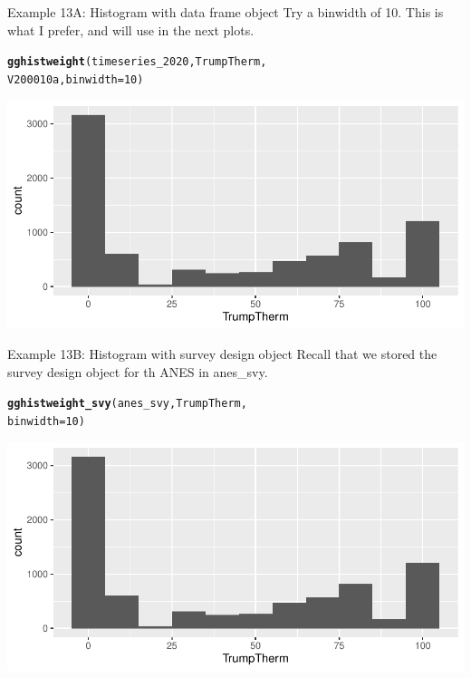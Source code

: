 \documentclass{beamer}\usepackage[]{graphicx}\usepackage[]{xcolor}
\makeatletter
\newcommand{\hlnum}[1]{\textcolor[rgb]{0.686,0.059,0.569}{#1}}%
\newcommand{\hlstd}[1]{\textcolor[rgb]{0.345,0.345,0.345}{#1}}%
\newcommand{\hlkwc}[1]{\textcolor[rgb]{0.333,0.667,0.333}{#1}}%
\newcommand{\hlkwd}[1]{\textcolor[rgb]{0.737,0.353,0.396}{\textbf{#1}}}%
\newenvironment{kframe}{%
 \def\at@end@of@kframe{}%
 \ifinner\ifhmode%
  \def\at@end@of@kframe{\end{minipage}}%
  \begin{minipage}{\columnwidth}%
 \fi\fi%
 \def\FrameCommand##1{\hskip\@totalleftmargin \hskip-\fboxsep
 \colorbox{shadecolor}{##1}\hskip-\fboxsep
     \hskip-\linewidth \hskip-\@totalleftmargin \hskip\columnwidth}%
 \MakeFramed {\advance\hsize-\width
   \@totalleftmargin\z@ \linewidth\hsize
   \@setminipage}}%
 {\par\unskip\endMakeFramed%
 \at@end@of@kframe}
\newenvironment{knitrout}{}{} %
\makeatother
\begin{document}
\begin{frame}[fragile]{Example 13A: Histogram with data frame object}
Try a binwidth of 10. This is what I prefer, and will use in the next plots.
\begin{knitrout}
\color{fgcolor}\begin{kframe}
\begin{alltt}
\hlkwd{gghistweight}\hlstd{(timeseries_2020, TrumpTherm,}
    \hlstd{V200010a,} \hlkwc{binwidth} \hlstd{=} \hlnum{10}\hlstd{)}
\end{alltt}
\end{kframe}
\includegraphics[width=0.95\linewidth]{figure/unnamed-chunk-73-1} 
\end{knitrout}

\end{frame}

\begin{frame}[fragile]{Example 13B: Histogram with survey design object}
Recall that we stored the survey design object for th ANES in anes\_svy.
\begin{knitrout}
\color{fgcolor}\begin{kframe}
\begin{alltt}
\hlkwd{gghistweight_svy}\hlstd{(anes_svy, TrumpTherm,}
    \hlkwc{binwidth} \hlstd{=} \hlnum{10}\hlstd{)}
\end{alltt}
\end{kframe}
\includegraphics[width=0.95\linewidth]{figure/unnamed-chunk-74-1} 
\end{knitrout}

\end{frame}
\end{document}
